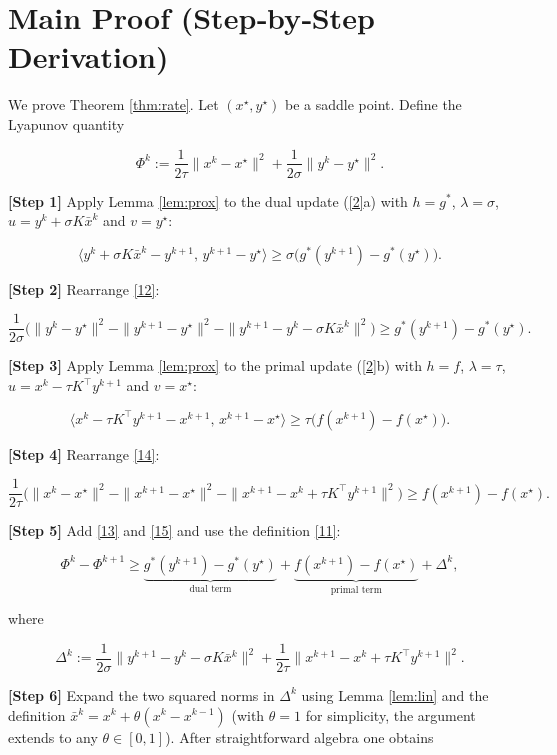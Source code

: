 \documentclass{article}
\newcommand{\ip}[2]{\langle #1,#2\rangle}
\begin{document}
\section*{Main Proof (Step‑by‑Step Derivation)}
We prove Theorem \ref{thm:rate}. Let $(x^{\star},y^{\star})$ be a saddle point. Define the Lyapunov quantity  

\[
\Phi^{k}:=
\frac{1}{2\tau}\|x^{k}-x^{\star}\|^{2}
+\frac{1}{2\sigma}\|y^{k}-y^{\star}\|^{2}.
\tag{11}
\]

\noindent\textbf{[Step 1]} Apply Lemma \ref{lem:prox} to the dual update (\ref{2}a) with $h=g^{*}$, $\lambda=\sigma$, $u=y^{k}+\sigma K\bar x^{k}$ and $v=y^{\star}$:

\[
\ip{y^{k}+\sigma K\bar x^{k}-y^{k+1}}{\,y^{k+1}-y^{\star}}
\ge \sigma\bigl(g^{*}(y^{k+1})-g^{*}(y^{\star})\bigr).
\tag{12}
\]

\noindent\textbf{[Step 2]} Rearrange \eqref{12}:

\[
\frac{1}{2\sigma}\bigl(\|y^{k}-y^{\star}\|^{2}
-\|y^{k+1}-y^{\star}\|^{2}
-\|y^{k+1}-y^{k}-\sigma K\bar x^{k}\|^{2}\bigr)
\ge g^{*}(y^{k+1})-g^{*}(y^{\star}).
\tag{13}
\]

\noindent\textbf{[Step 3]} Apply Lemma \ref{lem:prox} to the primal update (\ref{2}b) with $h=f$, $\lambda=\tau$, $u=x^{k}-\tau K^{\top}y^{k+1}$ and $v=x^{\star}$:

\[
\ip{x^{k}-\tau K^{\top}y^{k+1}-x^{k+1}}{\,x^{k+1}-x^{\star}}
\ge \tau\bigl(f(x^{k+1})-f(x^{\star})\bigr).
\tag{14}
\]

\noindent\textbf{[Step 4]} Rearrange \eqref{14}:

\[
\frac{1}{2\tau}\bigl(\|x^{k}-x^{\star}\|^{2}
-\|x^{k+1}-x^{\star}\|^{2}
-\|x^{k+1}-x^{k}+\tau K^{\top}y^{k+1}\|^{2}\bigr)
\ge f(x^{k+1})-f(x^{\star}).
\tag{15}
\]

\noindent\textbf{[Step 5]} Add \eqref{13} and \eqref{15} and use the definition \eqref{11}:

\[
\Phi^{k}-\Phi^{k+1}
\ge
\underbrace{g^{*}(y^{k+1})-g^{*}(y^{\star})}_{\text{dual term}}
+
\underbrace{f(x^{k+1})-f(x^{\star})}_{\text{primal term}}
+
\Delta^{k},
\tag{16}
\]

where  

\[
\Delta^{k}:=
\frac{1}{2\sigma}\|y^{k+1}-y^{k}-\sigma K\bar x^{k}\|^{2}
+\frac{1}{2\tau}\|x^{k+1}-x^{k}+\tau K^{\top}y^{k+1}\|^{2}.
\tag{17}
\]

\noindent\textbf{[Step 6]} Expand the two squared norms in $\Delta^{k}$ using Lemma \ref{lem:lin} and the definition $\bar x^{k}=x^{k}+\theta(x^{k}-x^{k-1})$ (with $\theta=1$ for simplicity, the argument extends to any $\theta\in[0,1]$). After straightforward algebra one obtains  
\end{document}
